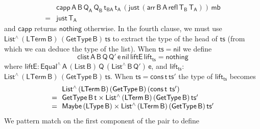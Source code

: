 \documentclass[sigplan,screen]{acmart}
\begin{document}
\[\begin{array}{ll}
 & \!\!\mathsf{capp\, A \,B \, Q_A \, Q_B \, t_{BA}\, t_A \, (just \,
  (arr\, B \,A\, refl\, T_B\, T_A))\, mb}\\ 
= & \!\!\mathsf{just\, T_A}
\end{array}\]
and $\mathsf{capp}$ returns $\mathsf{nothing}$ otherwise.  In the
fourth clause, we must use $\mathsf{List^{\wedge}\, (LTerm\, B)\,
  (GetType\, B)\, ts}$ to extract the type of the head of
$\mathsf{ts}$ (from which we can deduce the type of the list). When
$\mathsf{ts} = \mathsf{nil}$ we define \[\mathsf{clist\, A\, B\, Q\,
  Q'\, e\, nil \, liftE\, lift_{ts} = nothing}\] where
$\mathsf{liftE : Equal^{\wedge}\, A\, (List\,B) \, Q\,
  (List^{\wedge}\, B\, Q')\, e}$, and $\mathsf{lift_{ts} :}$\\
$\mathsf{List^{\wedge}\, (LTerm\, B)\, (GetType\, B)\, ts}$.  When
$\mathsf{ts} = \mathsf{cons\,t\,ts'}$
the type of $\mathsf{lift_{ts}}$ becomes
\[\begin{array}{ll}
& \!\!\mathsf{List^{\wedge}\, (LTerm\, B)\, (GetType\, B)\, (cons\, t}$
$\mathsf{ts')}\\
= & \!\!\mathsf{GetType\, B\, t \times List^{\wedge}\, (LTerm\, B)\,
  (GetType\, B)\, ts'}\\
= & \!\! \mathsf{Maybe\, (LType\, B) \times List^{\wedge}\, (LTerm\, B)\,
  (GetType\, B)\, ts'}
\end{array}\] We pattern match on the first component
of the pair to define
\end{document}
